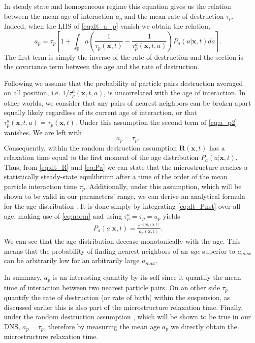 In steady state and homogeneous regime this equation gives us the relation between the mean age of interaction $a_p$ and the mean rate of destruction $\tau_p$. 
Indeed, when the LHS of \ref{eq:dt_a_p} vanish we obtain the relation,
\begin{equation}
    a_p
    = \tau_p \left[
        1
        + 
        \int_{\mathbb{R}} a\left(
            \frac{1}{\tau_p(\textbf{x},t)} 
            - \frac{1}{\tau_p^a(\textbf{x},t,a)} 
        \right) P_a(a|\textbf{x},t) da
    \right]. 
    \label{eq:a_p2}
\end{equation}
The first term is simply the inverse of the rate of destruction and the section is the covariance term between the age and the rate of destruction. 

Following \citep{zhang2023evolution} we assume that the probability of particle pairs destruction averaged on all position, i.e. $1/\tau_p^a(\textbf{x},t,a)$, is uncorrelated with the age of interaction. 
In other worlds, we consider that any pairs of nearest neighbors can be broken apart equally likely regardless of its current age of interaction, or that $\tau^a_p(\textbf{x},t,a) = \tau_p(\textbf{x},t)$.
Under this assumption the second term of \ref{eq:a_p2} vanishes. 
We are left with
\begin{equation}
    a_p = \tau_p. 
    \label{eq:a_p_eq_tau_p}
\end{equation}
Consequently, within the random destruction assumption $\textbf{R}(\textbf{x},t)$ has a relaxation time equal to the first moment of the age distribution $P_a(a|\textbf{x},t)$. 
Thus, from \ref{eq:dt_R} and \ref{eq:Pa} we can state that the microstructure reaches a statistically steady-state equilibrium after a time of the order of the mean particle interaction time $\tau_p$. 
Additionally,  under this assumption, which will be shown to be valid in our parameters' range, we can derive an analytical formula for the age distribution \citep{zhang2023evolution}. 
It is done simply by integrating \ref{eq:dt_Pnst} over all age, making use of \ref{eq:norm} and using $\tau_p^a = \tau_p = a_p$ yields
\begin{align}
    P_a(a|\textbf{x},t)  
    =\frac{e^{-a/a_p(\textbf{x},t)}}{a_p(\textbf{x},t)}.
    \label{eq:Pa}
\end{align} 
We can see that the age distribution decease monotonically with the age. 
This means that the probability of finding nearest neighbors of an \textit{age} superior to $a_{max}$ can be arbitrarily low for an arbitrarily large $a_{max}$. 

In summary, $a_p$ is an interesting quantity by its self since it quantify the mean time of interaction between two nearest particle pairs.
On an other side $\tau_p$ quantify the rate of destruction (or rate of birth) within the suspension, as discussed earlier this is also part of the microstructure relaxation time. 
Finally, under the random destruction assumption \citep{zhang2023evolution}, which will be shown to be true in our DNS, $a_p  =\tau_p$, therefore by measuring the mean age $a_p$ we directly obtain the microstructure relaxation time. 
 
